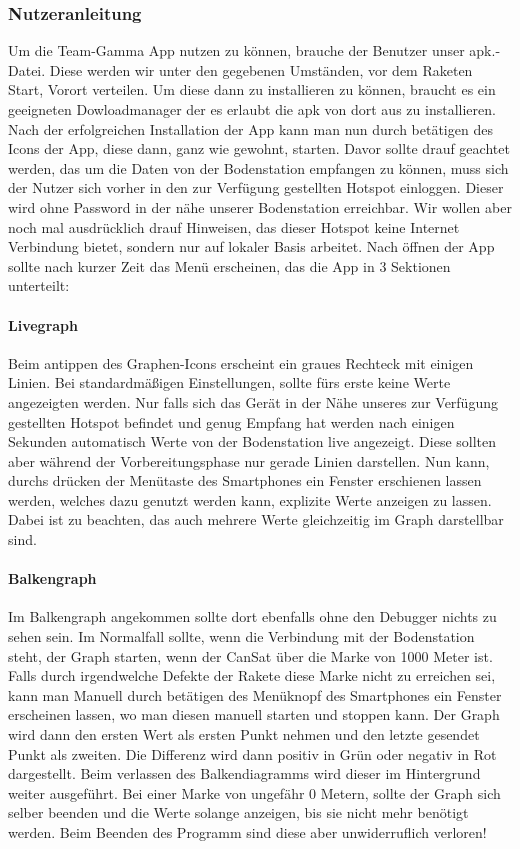 \subsubsection{Nutzeranleitung}
Um die Team-Gamma App nutzen zu können, brauche der Benutzer unser apk.-Datei. Diese werden wir unter den gegebenen Umständen, vor dem Raketen Start, Vorort verteilen. Um diese dann zu installieren zu können, braucht es ein geeigneten Dowloadmanager der es erlaubt die apk von dort aus zu installieren. Nach der erfolgreichen Installation der App kann man nun durch betätigen des Icons der App, diese dann, ganz wie gewohnt, starten. Davor sollte drauf geachtet werden, das um die Daten von der Bodenstation empfangen zu können, muss sich der Nutzer sich vorher in den zur Verfügung gestellten Hotspot einloggen. Dieser wird ohne Password in der nähe unserer Bodenstation erreichbar. Wir wollen aber noch mal ausdrücklich drauf Hinweisen, das dieser Hotspot keine Internet Verbindung bietet, sondern nur auf lokaler Basis arbeitet.
Nach öffnen der App sollte nach kurzer Zeit das Menü erscheinen, das die App in 3 Sektionen unterteilt: 

	\paragraph{Livegraph}
	Beim antippen des Graphen-Icons erscheint ein graues Rechteck mit einigen Linien. Bei standardmäßigen Einstellungen, sollte fürs erste keine Werte angezeigten werden. Nur falls sich das Gerät in der Nähe unseres zur Verfügung gestellten Hotspot befindet und genug Empfang hat werden nach einigen Sekunden automatisch Werte von der Bodenstation live angezeigt. Diese sollten aber während der Vorbereitungsphase nur gerade Linien darstellen. Nun kann, durchs drücken der Menütaste des Smartphones ein Fenster erschienen lassen werden, welches dazu genutzt werden kann, explizite Werte anzeigen zu lassen. Dabei ist zu beachten, das auch mehrere Werte gleichzeitig im Graph darstellbar sind.
	\paragraph{Balkengraph}
	Im Balkengraph angekommen sollte dort ebenfalls ohne den Debugger nichts zu sehen sein. Im Normalfall sollte, wenn die Verbindung mit der Bodenstation steht, der Graph starten, wenn der CanSat über die Marke von 1000 Meter ist. Falls durch irgendwelche Defekte der Rakete diese Marke nicht zu erreichen sei, kann man Manuell durch betätigen des Menüknopf des Smartphones ein Fenster erscheinen lassen, wo man diesen manuell starten und stoppen kann. Der Graph wird dann den ersten Wert als ersten Punkt nehmen und den letzte gesendet Punkt als zweiten. Die Differenz wird dann positiv in Grün oder negativ in Rot dargestellt. Beim verlassen des Balkendiagramms wird dieser im Hintergrund weiter ausgeführt. Bei einer Marke von ungefähr 0 Metern, sollte der Graph sich selber beenden und die Werte solange anzeigen, bis sie nicht mehr benötigt werden. Beim Beenden des Programm sind diese aber unwiderruflich verloren!

